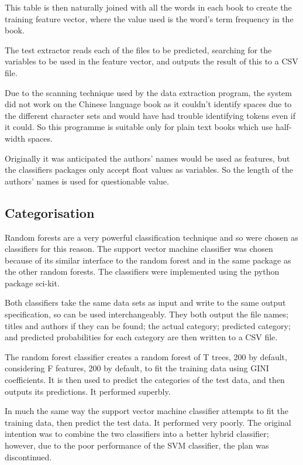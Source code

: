 \documentclass[11pt]{article}
\begin{document}
This table is then naturally joined with all the words in each book to create
the training feature vector, where the value used is the word's term frequency
in the book. 

The test extractor reads each of the files to be predicted, searching for the
variables to be used in the feature vector, and outputs the result of this to a
CSV file.

Due to the scanning technique used by the data extraction program, the system
did not work on the Chinese language book as it couldn't identify spaces due to
the different character sets and would have had trouble identifying tokens even
if it could. So this programme is suitable only for plain text books which use
half-width spaces.

Originally it was anticipated the authors' names would be used as features, but
the classifiers packages only accept float values as variables. So the length of
the authors' names is used for questionable value.

\subsection{Categorisation}

Random forests are a very powerful classification technique and so were chosen
as classifiers for this reason. The support vector machine classifier was chosen
because of its similar interface to the random forest and in the same package as
the other random forests. The classifiers were implemented using the python
package sci-kit.

Both classifiers take the same data sets as input and write to the same output
specification, so can be used interchangeably. They both output the file names;
titles and authors if they can be found; the actual category; predicted
category; and predicted probabilities for each category are then written to a
CSV file.

The random forest classifier creates a random forest of T trees, 200 by
default, considering F features, 200 by default, to fit the training data using
GINI coefficients. It is then used to predict the categories of the test data,
and then outputs its predictions. It performed superbly.

In much the same way the support vector machine classifier attempts to fit the
training data, then predict the test data. It performed very poorly. The
original intention was to combine the two classifiers into a better hybrid
classifier; however, due to the poor performance of the SVM classifier, the plan
was discontinued.
\end{document}
